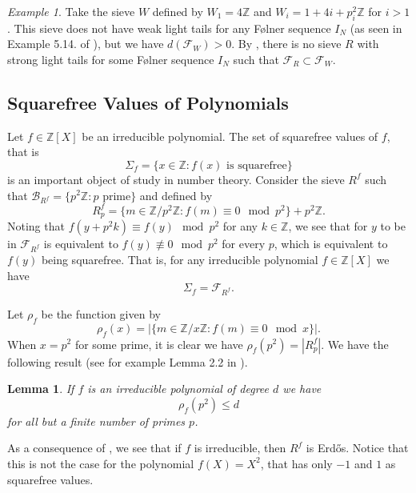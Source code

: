 \documentclass[a4paper,11pt,reqno]{amsart}
\theoremstyle{plain}
\newtheorem{lemma}[theorem]{Lemma}
\theoremstyle{remark}
\newtheorem{example}[theorem]{Example}
\newcommand{\z}{\mathbb{Z}}
\newcommand{\cb}{\mathcal{B}}
\newcommand{\cf}{\mathcal{F}}
\newcommand{\fr}{\mathcal{F}_R}
\newcommand{\frf}{\mathcal{F}_{R^f}}
\begin{document}
				\begin{example}
					Take the sieve $W$ defined by $W_1 = 4\z$ and $W_i = 1+4i + p_i^2\z$ for $i>1$. This sieve does not have weak light tails for any Følner sequence $I_N$ (as seen in Example 5.14. of \cite{part1}), but we have $d(\cf_W)>0$. By , there is no sieve $R$ with strong light tails for some Følner sequence $I_N$ such that $\fr \subset \cf_W$.
				\end{example}
				
				
				
				\subsection{Squarefree Values of Polynomials}
				
				
				Let $f\in \z[X]$ be an irreducible polynomial. The set of squarefree values of $f$, that is $$ \Sigma_f = \{x \in \z: f(x) \text{ is squarefree}\}$$ is an important object of study in number theory. Consider the sieve $R^f$ such that $\cb_{R^f} = \{p^2\z:  p\text{ prime}\}$ and defined by $$R^f_p = \{m\in \z/p^2\z: f(m) \equiv 0 \mod p^2\} + p^2\z.$$ 
				Noting that $f(y+p^2k) \equiv f(y) \mod p^2$ for any $k \in \z$, we see that for $y$ to be in $\frf$ is equivalent to $f(y) \not \equiv 0 \mod p^2$ for every $p$, which is equivalent to $f(y)$ being squarefree. That is, for any irreducible polynomial $f \in \z[X]$ we have
				\begin{equation}
					\label{eq: sigmaf equals frf}
					\Sigma_f = \frf.
				\end{equation}
				
				Let $\rho_f$ be the function given by $$\rho_f(x) = |\{m\in \z/x\z: f(m) \equiv 0 \mod x\}|.$$ When $x = p^2$ for some prime, it is clear we have $\rho_f(p^2) = |R^f_p|$. We have the following result (see for example Lemma 2.2 in \cite{Brwoning}).
				
				\begin{lemma}
					\label{lm: rho smaller than degree}
					If $f$ is an irreducible polynomial of degree $d$  we have $$\rho_f(p^2) \leq d$$ for all but a finite number of primes $p$.
				\end{lemma}
				
				As a consequence of , we see that if $f$ is irreducible, then $R^f$ is Erdős. Notice that this is not the case for the polynomial $f(X) = X^2$, that has only $-1$ and $1$ as squarefree values.
				
\end{document}
